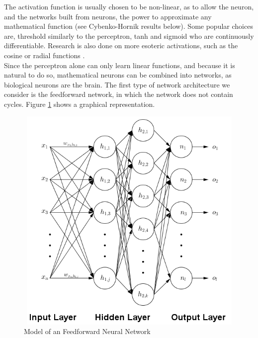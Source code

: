 \documentclass[12pt,oneside]{CUNY_CS_PhD}
\begin{document}
The activation function is usually chosen to be non-linear, as to allow the neuron, and the networks built from neurons, the power to approximate any mathematical function (see Cybenko-Hornik results below). 
Some popular choices are, threshold similarly to the perceptron, tanh and sigmoid who are continuously differentiable. Research is also done on more esoteric activations, such as the cosine or radial functions \cite{lee_cosine-modulated_1996}.\\
Since the perceptron alone can only learn linear functions, and because it is natural to do so, mathematical neurons can be combined into networks, as biological neurons are the brain. 
The first type of network architecture we consider is the feedforward network, in which the  network does not contain cycles. Figure \ref{fig:feedforward} shows a graphical representation.\\
\begin{figure}[h]
\centering
\includegraphics[keepaspectratio=false, height=11.09cm, width=12.5cm]{pictures/FeedForwardNeuralNetwork.png}
\caption{Model of an Feedforward Neural Network}
\label{fig:feedforward}
\end{figure}
\end{document}
